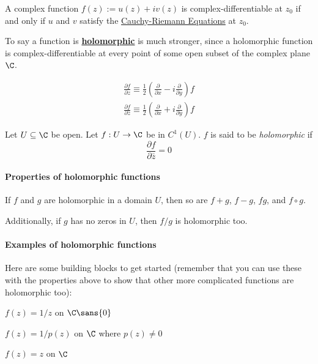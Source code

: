 \label{d1d5d93}

A complex function $f(z):=u(z)+iv(z)$ is complex-differentiable at $z_0$ if and
only if $u$ and $v$ satisfy the \href{fb10fd3}{Cauchy-Riemann Equations} at
$z_0$.

To say a function is \href{e1e08f7}{\textbf{holomorphic}} is much stronger,
since a holomorphic function is complex-differentiable at every point of some
open subset of the complex plane $\C$.

\label{ffea0ed}

\begin{gather*}
  \frac{\partial f}{\partial z}\equiv\frac12\left(\frac{\partial}{\partial x}-i\frac{\partial}{\partial y}\right)f \\[1em]
  \frac{\partial f}{\partial\bar z}\equiv\frac12\left(\frac{\partial}{\partial x}+i\frac{\partial}{\partial y}\right)f
\end{gather*}

\label{e1e08f7}

Let $U\subseteq\C$ be open. Let $f:U\to\C$ be in $C^1(U)$. $f$ is said to be
\textit{holomorphic} if
$$
  \frac{\partial f}{\partial\bar z}=0
$$

\paragraph{Properties of holomorphic functions}

If $f$ and $g$ are holomorphic in a domain $U$, then so are $f+g$, $f-g$, $fg$,
and $f\circ g$.

Additionally, if $g$ has no zeros in $U$, then $f/g$ is holomorphic too.

\paragraph{Examples of holomorphic functions}

Here are some building blocks to get started (remember that you can use these
with the properties above to show that other more complicated functions are
holomorphic too):
\begin{enumerati}
  \item $f(z)=1/z$ on $\C\sans{0}$
  \item $f(z)=1/p(z)$ on $\C$ where $p(z)\neq0$
  \item $f(z)=z$ on $\C$
\end{enumerati}

